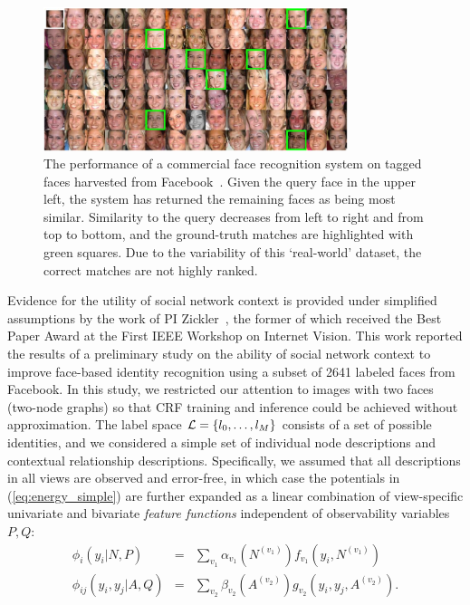 \begin{figure}[t!]
\begin{center}
\includegraphics[width=3.5in]{ivw_facescores}
\end{center}
\vspace{-0.25in} \caption{\captionsize 
The performance of a commercial face recognition system on tagged faces harvested from Facebook~\cite{Stone2008}. Given the query face in the upper left, the system has returned the remaining faces as being most similar. Similarity to the query decreases from left to right and from top to bottom, and the ground-truth matches are highlighted with green squares. Due to the variability of this `real-world' dataset, the correct matches are not highly ranked.\label{fig:face-results}\afterfigspace}
\end{figure}



\label{sec:prelim-face-results}
Evidence for the utility of social network context is provided under simplified assumptions by the work of PI Zickler~\cite{Stone2008,Stone2010}, the former of which received the Best Paper Award at the First IEEE Workshop on Internet Vision. This work reported the results of a preliminary study on the ability of social network context to improve face-based identity recognition using a subset of 2641 labeled faces from Facebook. In this study, we restricted our attention to images with two faces (two-node graphs) so that CRF training and inference could be achieved without approximation. The label space ${\cal L}=\{l_0,\ldots,l_M\}$  consists of a set of possible identities, and we considered a simple set of individual node descriptions and contextual relationship descriptions. Specifically, we assumed that all descriptions in all views are observed and error-free, in which case the potentials in (\ref{eq:energy_simple}) are further expanded as a linear combination of view-specific univariate and bivariate \emph{feature functions} independent of observability variables $P,Q$:
\begin{eqnarray}
\phi_i(y_i|N,P) &=& \sum_{v_1} \alpha_{v_1}(N^{(v_1)}) f_{v_1}(y_i, N^{(v_1)})\\
\phi_{ij}(y_i, y_j|A,Q) &=& \sum_{v_2} \beta_{v_2}(A^{(v_2)}) g_{v_2}(y_i, y_j, A^{(v_2)}).
\end{eqnarray}


